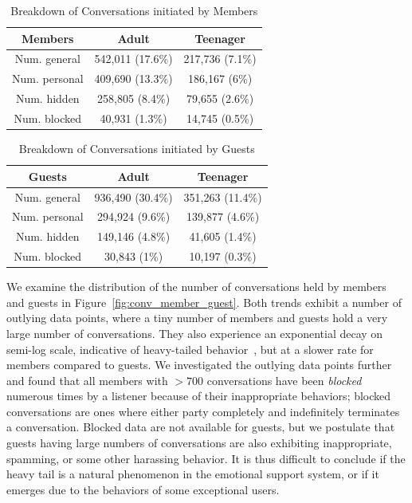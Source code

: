 \begin{table}
	\centering
	\begin{tabular}{c | c | c} 
		Members & Adult & Teenager \\ 
		\hline
		Num. general & 542,011 (17.6\%) & 217,736 (7.1\%)    \\
		Num. personal &   409,690 (13.3\%) & 186,167 (6\%)  \\
		Num. hidden & 258,805 (8.4\%) & 79,655 (2.6\%) \\
		Num. blocked & 40,931 (1.3\%) & 14,745 (0.5\%) \\
	\end{tabular}
	\caption{Breakdown of Conversations initiated by Members}
	\label{table 4.3}
\end{table}


\begin{table}
	\centering
	\begin{tabular}{c | c | c} 
		Guests & Adult & Teenager \\ 
		\hline
		Num. general & 936,490 (30.4\%) & 351,263 (11.4\%)    \\
		Num. personal & 294,924 (9.6\%) & 139,877 (4.6\%)  \\
		Num. hidden & 149,146 (4.8\%) & 41,605 (1.4\%) \\
		Num. blocked & 30,843 (1\%) & 10,197 (0.3\%) \\
	\end{tabular}
	\caption{Breakdown of Conversations initiated by Guests}
	\label{table 4.4}
\end{table}


We examine the distribution of the number of conversations held by members and guests
in Figure~\ref{fig:conv_member_guest}. Both trends exhibit a number of outlying data points, where a tiny number of members and guests hold a very large number of conversations. 
They also experience an exponential decay on semi-log scale, 
indicative of heavy-tailed behavior~\cite{lipsky2008queueing},
but at a slower rate for members compared to guests.
We investigated the outlying data points further and found that
all members with $> 700$ conversations have been {\em blocked} numerous times by a listener
because of their inappropriate behaviors; 
blocked conversations are ones where either party completely and indefinitely 
terminates a conversation. Blocked data are not available for guests, but we postulate that 
guests having large numbers of conversations are also exhibiting inappropriate, spamming, or 
some other harassing behavior. 
It is thus difficult to conclude if the heavy tail is 
a natural phenomenon in the emotional support system, or if it
emerges due to the behaviors of some exceptional users.


